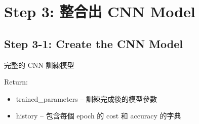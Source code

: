 \documentclass[11pt]{article}
\providecommand{\tightlist}{%
      \setlength{\itemsep}{0pt}\setlength{\parskip}{0pt}}
\begin{document}
    \section{Step 3: 整合出 CNN
Model}\label{step-3-ux6574ux5408ux51fa-cnn-model}

    \subsection{Step 3-1: Create the CNN
Model}\label{step-3-1-create-the-cnn-model}

完整的 CNN 訓練模型

Return:

\begin{itemize}
\tightlist
\item
  trained\_parameters -- 訓練完成後的模型參數
\item
  history -- 包含每個 epoch 的 cost 和 accuracy 的字典
\end{itemize}
\end{document}
